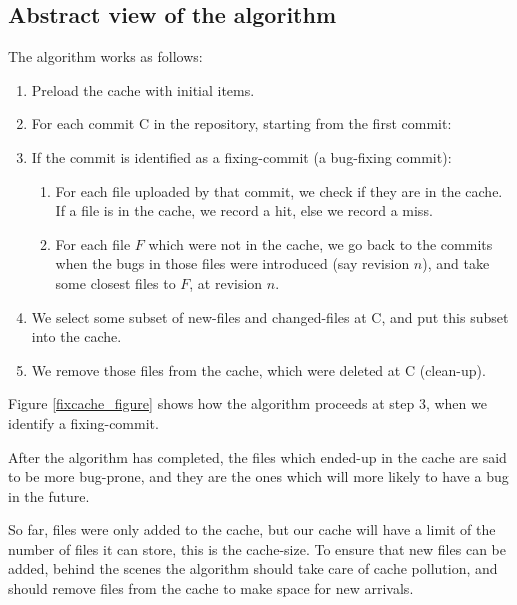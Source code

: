 \documentclass[12pt,twoside,notitlepage]{report}
\begin{document}
\subsection{Abstract view of the algorithm}
The algorithm works as follows:
\begin{enumerate}
	\item Preload the cache with initial items.
	\item For each commit C in the repository, starting from the first commit:
	
	\item If the commit is identified as a fixing-commit (a bug-fixing commit):
	\begin{enumerate}
	\item For each file uploaded by that commit, we check if they are in the cache. If a file is in the cache, we record a hit, else we record a miss.
	\item For each file $F$ which were not in the cache, we go back to the commits when the bugs in those files were introduced (say revision $n$), and take some closest files to $F$, at revision $n$.
	\end{enumerate}
	\item We select some subset of new-files and changed-files at C, and put this subset into the cache.
	\item We remove those files from the cache, which were deleted at C (clean-up).
\end{enumerate}

Figure \ref{fixcache_figure} shows how the algorithm proceeds at step 3, when we identify a fixing-commit.

After the algorithm has completed, the files which ended-up in the cache are said to be more bug-prone, and they are the ones which will more likely to have a bug in the future.

So far, files were only added to the cache, but our cache will have a limit of the number of files it can store, this is the cache-size. To ensure that new files can be added, behind the scenes the algorithm should take care of cache pollution, and should remove files from the cache to make space for new arrivals.
\end{document}
